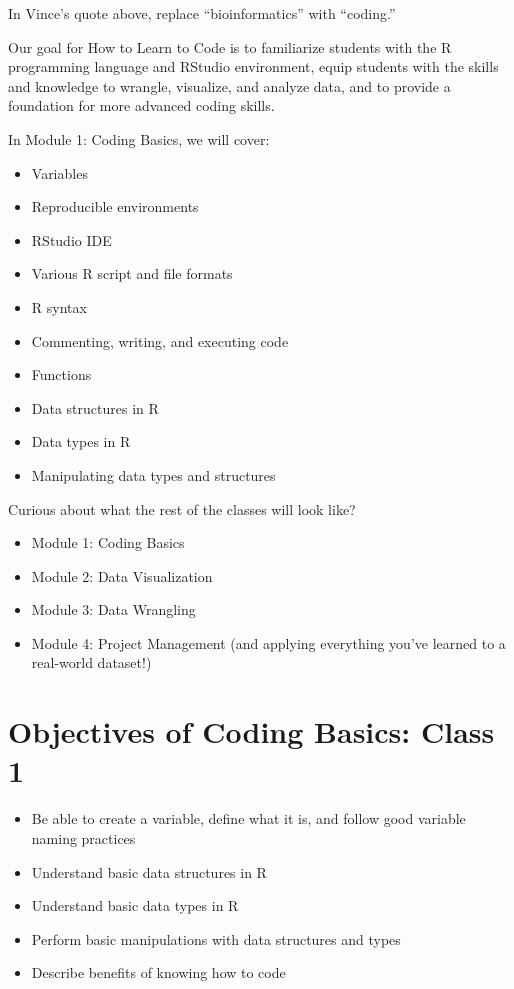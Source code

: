 \documentclass[
  letterpaper,
  DIV=11,
  numbers=noendperiod]{scrreprt}
\providecommand{\tightlist}{%
  \setlength{\itemsep}{0pt}\setlength{\parskip}{0pt}}\usepackage{longtable,booktabs,array}
\begin{document}
In Vince's quote above, replace ``bioinformatics'' with ``coding.''

Our goal for How to Learn to Code is to familiarize students with the R
programming language and RStudio environment, equip students with the
skills and knowledge to wrangle, visualize, and analyze data, and to
provide a foundation for more advanced coding skills.

In Module 1: Coding Basics, we will cover:

\begin{itemize}
\tightlist
\item
  Variables
\item
  Reproducible environments
\item
  RStudio IDE
\item
  Various R script and file formats
\item
  R syntax
\item
  Commenting, writing, and executing code
\item
  Functions
\item
  Data structures in R
\item
  Data types in R
\item
  Manipulating data types and structures
\end{itemize}

Curious about what the rest of the classes will look like?

\begin{itemize}
\item
  Module 1: Coding Basics
\item
  Module 2: Data Visualization
\item
  Module 3: Data Wrangling
\item
  Module 4: Project Management (and applying everything you've learned
  to a real-world dataset!)
\end{itemize}

\hypertarget{objectives-of-coding-basics-class-1}{%
\section{Objectives of Coding Basics: Class
1}\label{objectives-of-coding-basics-class-1}}

\begin{itemize}
\item
  Be able to create a variable, define what it is, and follow good
  variable naming practices
\item
  Understand basic data structures in R
\item
  Understand basic data types in R
\item
  Perform basic manipulations with data structures and types
\item
  Describe benefits of knowing how to code
\end{itemize}
\end{document}
